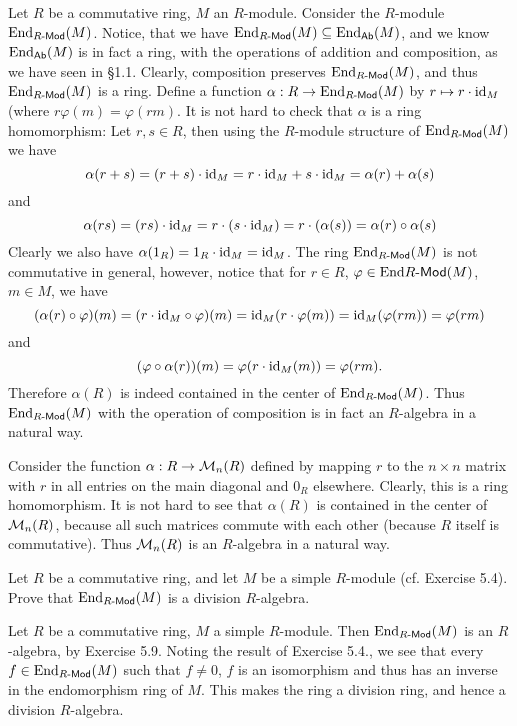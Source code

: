 \begin{solution}
	Let $R$ be a commutative ring, $M$ an $R$-module. Consider the $R$-module $\mathrm{End}_{R\text{-}\mathsf{Mod}}(M)$. Notice, that we have $\mathrm{End}_{R\text{-}\mathsf{Mod}}(M) \subseteq \mathrm{End}_{\mathsf{Ab}}(M)$, and we know $\mathrm{End}_{\mathsf{Ab}}(M)$ is in fact a ring, with the operations of addition and composition, as we have seen in \S 1.1. Clearly, composition preserves $\mathrm{End}_{R\text{-}\mathsf{Mod}}(M)$, and thus $\mathrm{End}_{R\text{-}\mathsf{Mod}}(M)$ is a ring. Define a function $\alpha: R \to \mathrm{End}_{R\text{-}\mathsf{Mod}}(M)$ by $r \mapsto r \cdot \mathrm{id}_M$ (where $r \varphi(m) = \varphi(rm)$. It is not hard to check that $\alpha$ is a ring homomorphism: Let $r, s \in R$, then using the $R$-module structure of $\mathrm{End}_{R\text{-}\mathsf{Mod}}(M)$ we have
	\[
		\alpha(r + s) = (r+s) \cdot \mathrm{id}_M = r \cdot \mathrm{id}_M + s \cdot \mathrm{id}_M = \alpha(r) + \alpha(s)
	\]
	and
	\[
		\alpha(rs) = (rs) \cdot \mathrm{id}_M = r \cdot (s \cdot \mathrm{id}_M) = r \cdot (\alpha(s)) = \alpha(r) \circ \alpha(s)
	\]
	Clearly we also have $\alpha(1_R) = 1_R \cdot \mathrm{id}_M = \mathrm{id}_M$. The ring $\mathrm{End}_{R\text{-}\mathsf{Mod}}(M)$ is not commutative in general, however, notice that for $r \in R$, $\varphi \in \mathrm{End}{R\text{-}\mathsf{Mod}}(M)$, $m \in M$, we have
	\[
		(\alpha(r) \circ \varphi)(m) = (r \cdot \mathrm{id}_M \circ \varphi)(m) = \mathrm{id}_M(r \cdot \varphi(m)) = \mathrm{id}_M(\varphi(rm)) = \varphi(rm)
	\]
	and
	\[
		(\varphi \circ \alpha(r))(m) = \varphi(r \cdot \mathrm{id}_M(m)) = \varphi(rm) \text{.}
	\]
	Therefore $\alpha(R)$ is indeed contained in the center of $\mathrm{End}_{R\text{-}\mathsf{Mod}}(M)$. Thus $\mathrm{End}_{R\text{-}\mathsf{Mod}}(M)$ with the operation of composition is in fact an $R$-algebra in a natural way.
	
	Consider the function $\alpha: R \to \mathcal{M}_n(R)$ defined by mapping $r$ to the $n \times n$ matrix with $r$ in all entries on the main diagonal and $0_R$ elsewhere. Clearly, this is a ring homomorphism. It is not hard to see that $\alpha(R)$ is contained in the center of $\mathcal{M}_n(R)$, because all such matrices commute with each other (because $R$ itself is commutative). Thus $\mathcal{M}_n(R)$ is an $R$-algebra in a natural way.
\end{solution}

\begin{problem}
	Let $R$ be a commutative ring, and let $M$ be a simple $R$-module (cf. Exercise 5.4). Prove that $\mathrm{End}_{R\text{-}\mathsf{Mod}}(M)$ is a division $R$-algebra.
\end{problem}

\begin{solution}
	Let $R$ be a commutative ring, $M$ a simple $R$-module. Then $\mathrm{End}_{R\text{-}\mathsf{Mod}}(M)$ is an $R$-algebra, by Exercise 5.9. Noting the result of Exercise 5.4., we see that every $f \in \mathrm{End}_{R\text{-}\mathsf{Mod}}(M)$ such that $f \neq 0$, $f$ is an isomorphism and thus has an inverse in the endomorphism ring of $M$. This makes the ring a division ring, and hence a division $R$-algebra.
\end{solution}

